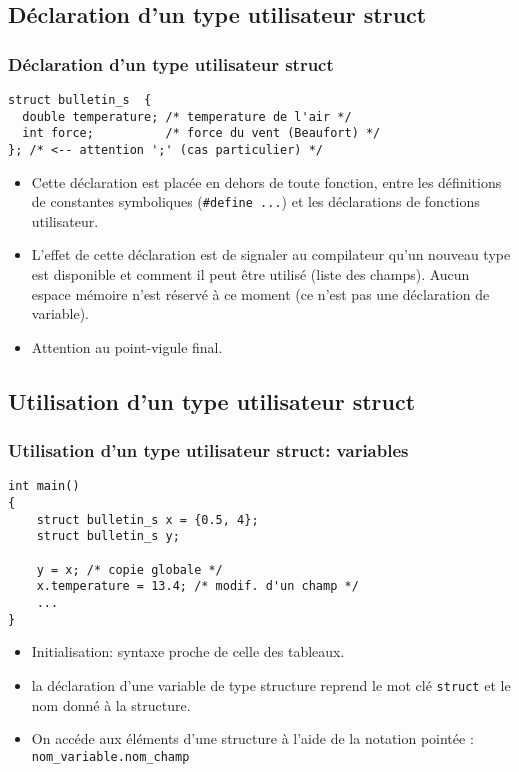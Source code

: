 \documentclass[xcolor=pdftex,svgnames,table]{beamer}
\begin{document}
\subsection[Déclaration]{Déclaration d'un type utilisateur struct}
\begin{frame}[fragile]
  \frametitle{Déclaration d'un type utilisateur struct}
\begin{lstlisting}[escapechar={\%},basicstyle=\ttfamily\small] 
struct bulletin_s  {
  double temperature; /* temperature de l'air */
  int force;          /* force du vent (Beaufort) */
}; /* <-- attention ';' (cas particulier) */
\end{lstlisting}
\pause
\begin{itemize}
\item Cette déclaration est placée en dehors de toute fonction, entre
les définitions de constantes symboliques (\verb|#define ...|) et les
déclarations de fonctions utilisateur.
\pause
\item L'effet de cette déclaration est de signaler au compilateur qu'un nouveau
type est disponible et comment il peut être utilisé (liste des champs). Aucun espace mémoire n'est réservé à ce moment
(ce n'est pas une déclaration de variable).
\item \pause \alert{Attention au point-vigule final}.
\end{itemize}
\end{frame}

\subsection[Utilisation]{Utilisation d'un type utilisateur struct}
\begin{frame}[fragile]
  \frametitle{Utilisation d'un type utilisateur struct: variables}

\begin{lstlisting}[escapechar={\%},basicstyle=\ttfamily\small] 
int main()
{
    struct bulletin_s x = {0.5, 4};
    struct bulletin_s y;
    
    y = x; /* copie globale */
    x.temperature = 13.4; /* modif. d'un champ */
    ...
}
\end{lstlisting}
\pause
\begin{itemize}
\item Initialisation:  syntaxe proche de celle des tableaux.
\pause
\item la déclaration d'une variable de type structure reprend le mot
  clé \verb|struct| et le nom donné à la structure.
\pause
\item On accéde aux éléments d'une structure à l'aide de la notation
  pointée :
\verb|nom_variable.nom_champ|
\end{itemize}
\end{frame}
\end{document}
